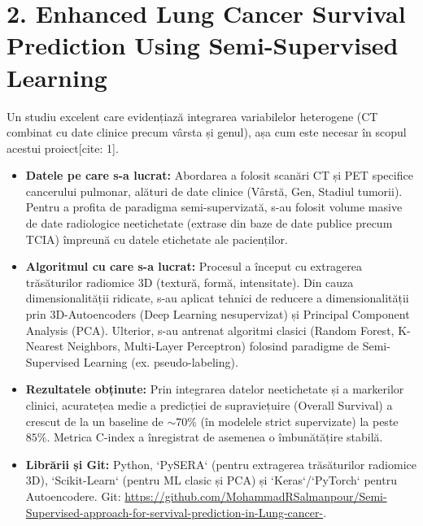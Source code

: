 \documentclass[runningheads,a4paper,11pt]{report}
\begin{document}
\section{2. Enhanced Lung Cancer Survival Prediction Using Semi-Supervised Learning}
Un studiu excelent care evidențiază integrarea variabilelor heterogene (CT combinat cu date clinice precum vârsta și genul), așa cum este necesar în scopul acestui proiect[cite: 1].
\begin{itemize}
    \item \textbf{Datele pe care s-a lucrat:} Abordarea a folosit scanări CT și PET specifice cancerului pulmonar, alături de date clinice (Vârstă, Gen, Stadiul tumorii). Pentru a profita de paradigma semi-supervizată, s-au folosit volume masive de date radiologice neetichetate (extrase din baze de date publice precum TCIA) împreună cu datele etichetate ale pacienților.
    \item \textbf{Algoritmul cu care s-a lucrat:} Procesul a început cu extragerea trăsăturilor radiomice 3D (textură, formă, intensitate). Din cauza dimensionalității ridicate, s-au aplicat tehnici de reducere a dimensionalității prin 3D-Autoencoders (Deep Learning nesupervizat) și Principal Component Analysis (PCA). Ulterior, s-au antrenat algoritmi clasici (Random Forest, K-Nearest Neighbors, Multi-Layer Perceptron) folosind paradigme de Semi-Supervised Learning (ex. pseudo-labeling).
    \item \textbf{Rezultatele obținute:} Prin integrarea datelor neetichetate și a markerilor clinici, acuratețea medie a predicției de supraviețuire (Overall Survival) a crescut de la un baseline de $\sim 70\%$ (în modelele strict supervizate) la peste $85\%$. Metrica C-index a înregistrat de asemenea o îmbunătățire stabilă.
    \item \textbf{Librării și Git:} Python, `PySERA` (pentru extragerea trăsăturilor radiomice 3D), `Scikit-Learn` (pentru ML clasic și PCA) și `Keras`/`PyTorch` pentru Autoencodere. Git: \url{https://github.com/MohammadRSalmanpour/Semi-Supervised-approach-for-servival-prediction-in-Lung-cancer-}.
\end{itemize}
\end{document}
